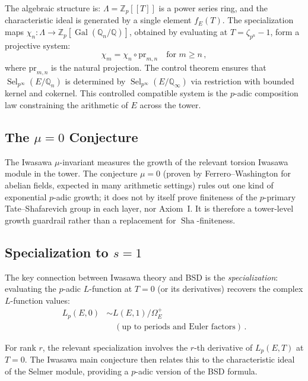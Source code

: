 \documentclass[aps,prd,twocolumn,superscriptaddress,nofootinbib,floatfix]{revtex4-2}
\theoremstyle{definition}
\theoremstyle{remark}
\DeclareMathOperator{\Sel}{Sel}
\DeclareMathOperator{\Sha}{Sha}
\DeclareMathOperator{\Gal}{Gal}
\begin{document}
The algebraic structure is: $\Lambda = \mathbb{Z}_p[[T]]$ is a power series ring, and the characteristic ideal is generated by a single element $f_E(T)$. The specialization maps $\chi_n: \Lambda \to \mathbb{Z}_p[\Gal(\mathbb{Q}_n/\mathbb{Q})]$, obtained by evaluating at $T = \zeta_{p^n} - 1$, form a projective system:
\begin{equation}
\chi_m = \chi_n \circ \mathrm{pr}_{m,n} \quad \text{for } m \geq n\,,
\end{equation}
where $\mathrm{pr}_{m,n}$ is the natural projection. The control theorem ensures that $\Sel_{p^\infty}(E/\mathbb{Q}_n)$ is determined by $\Sel_{p^\infty}(E/\mathbb{Q}_\infty)$ via restriction with bounded kernel and cokernel. This controlled compatible system is the $p$-adic composition law constraining the arithmetic of $E$ across the tower.

\subsection{\texorpdfstring{The $\mu = 0$ Conjecture}{The mu = 0 Conjecture}}

The Iwasawa $\mu$-invariant measures the growth of the relevant torsion Iwasawa module in the tower. The conjecture $\mu = 0$ (proven by Ferrero--Washington for abelian fields, expected in many arithmetic settings) rules out one kind of exponential $p$-adic growth; it does not by itself prove finiteness of the $p$-primary Tate--Shafarevich group in each layer, nor Axiom~I. It is therefore a tower-level growth guardrail rather than a replacement for $\Sha$-finiteness.

\subsection{\texorpdfstring{Specialization to $s = 1$}{Specialization to s = 1}}

The key connection between Iwasawa theory and BSD is the \textit{specialization}: evaluating the $p$-adic $L$-function at $T = 0$ (or its derivatives) recovers the complex $L$-function values:
\begin{equation}
\begin{aligned}
L_p(E, 0) &\sim L(E, 1)/\Omega_E^+ \\
&\quad (\text{up to periods and Euler factors})\,.
\end{aligned}
\end{equation}

For rank $r$, the relevant specialization involves the $r$-th derivative of $L_p(E, T)$ at $T = 0$. The Iwasawa main conjecture then relates this to the characteristic ideal of the Selmer module, providing a $p$-adic version of the BSD formula.
\end{document}

